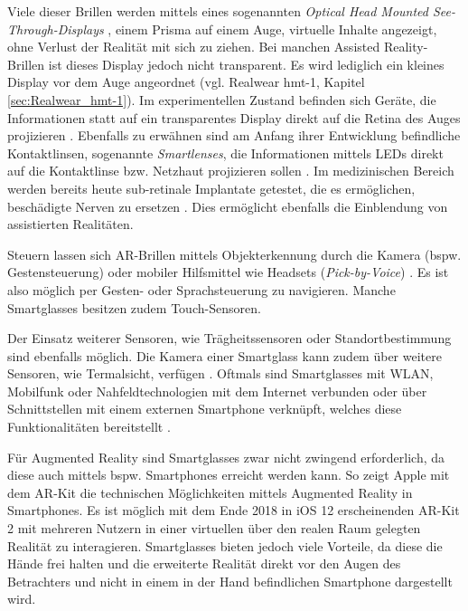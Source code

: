 Viele dieser Brillen werden mittels eines sogenannten \emph{Optical Head Mounted See-Through-Displays} \cite[S.~26]{Schwenke2016}, einem Prisma auf einem Auge, virtuelle Inhalte angezeigt, ohne Verlust der Realität mit sich zu ziehen. Bei manchen Assisted Reality-Brillen ist dieses Display jedoch nicht transparent. Es wird lediglich ein kleines Display vor dem Auge angeordnet (vgl. Realwear hmt-1, Kapitel \ref{sec:Realwear_hmt-1}). Im experimentellen Zustand befinden sich Geräte, die Informationen statt auf ein transparentes Display direkt auf die Retina des Auges projizieren \cite[S.~241]{Broll2013}. Ebenfalls zu erwähnen sind am Anfang ihrer Entwicklung befindliche Kontaktlinsen, sogenannte \emph{Smartlenses}, die Informationen mittels LEDs direkt auf die Kontaktlinse bzw. Netzhaut projizieren sollen \cite{Donath2014, Schwan2014}. Im medizinischen Bereich werden bereits heute sub-retinale Implantate getestet, die es ermöglichen, beschädigte Nerven zu ersetzen \cite{Young2013}. Dies ermöglicht ebenfalls die Einblendung von assistierten Realitäten.

Steuern lassen sich AR-Brillen mittels Objekterkennung durch die Kamera (bspw. Gestensteuerung) oder mobiler Hilfsmittel wie Headsets (\emph{Pick-by-Voice}) \cite{INTRALOGISTIK2016}. Es ist also möglich per Gesten- oder Sprachsteuerung zu navigieren. Manche Smartglasses besitzen zudem Touch-Sensoren.

Der Einsatz weiterer Sensoren, wie Trägheitssensoren oder Standortbestimmung sind ebenfalls möglich. Die Kamera einer Smartglass kann zudem über weitere Sensoren, wie Termalsicht, verfügen \cite[S.~27]{Schwenke2016}. Oftmals sind Smartglasses mit WLAN, Mobilfunk oder Nahfeldtechnologien mit dem Internet verbunden oder über Schnittstellen mit einem externen Smartphone verknüpft, welches diese Funktionalitäten bereitstellt \cite[S.~28]{Schwenke2016}.

Für Augmented Reality sind Smartglasses zwar nicht zwingend erforderlich, da diese auch mittels bspw. Smartphones erreicht werden kann. So zeigt Apple mit dem AR-Kit \cite{Apple2018} die technischen Möglichkeiten mittels Augmented Reality in Smartphones. Es ist möglich mit dem Ende 2018 in iOS 12 erscheinenden AR-Kit 2 mit mehreren Nutzern in einer virtuellen über den realen Raum gelegten Realität zu interagieren. Smartglasses bieten jedoch viele Vorteile, da diese die Hände frei halten und die erweiterte Realität direkt vor den Augen des Betrachters und nicht in einem in der Hand befindlichen Smartphone dargestellt wird.


